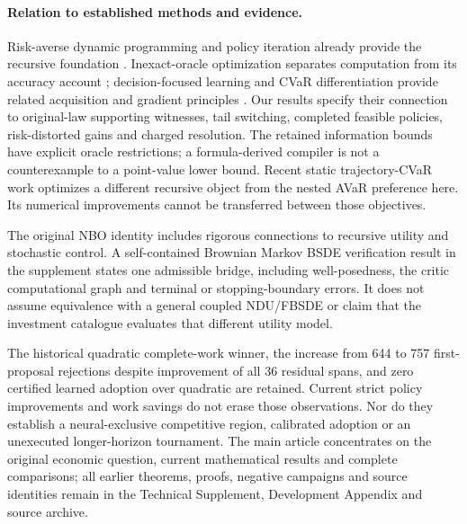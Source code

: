 \paragraph{Relation to established methods and evidence.}
Risk-averse dynamic programming and policy iteration already provide the recursive foundation \citep{ruszczynski2010risk,ruszczynski2014erratum}. Inexact-oracle optimization separates computation from its accuracy account \citep{DevolderGlineurNesterov2014}; decision-focused learning and CVaR differentiation provide related acquisition and gradient principles \citep{ElmachtoubGrigas2022,Tamar2015}. Our results specify their connection to original-law supporting witnesses, tail switching, completed feasible policies, risk-distorted gains and charged resolution. The retained information bounds have explicit oracle restrictions; a formula-derived compiler is not a counterexample to a point-value lower bound. Recent static trajectory-CVaR work \citep{LuoDelage2026} optimizes a different recursive object from the nested AVaR preference here. Its numerical improvements cannot be transferred between those objectives.

The original NBO identity includes rigorous connections to recursive utility and stochastic control. A self-contained Brownian Markov BSDE verification result in the supplement states one admissible bridge, including well-posedness, the critic computational graph and terminal or stopping-boundary errors. It does not assume equivalence with a general coupled NDU/FBSDE or claim that the investment catalogue evaluates that different utility model.

The historical quadratic complete-work winner, the increase from 644 to 757 first-proposal rejections despite improvement of all 36 residual spans, and zero certified learned adoption over quadratic are retained. Current strict policy improvements and work savings do not erase those observations. Nor do they establish a neural-exclusive competitive region, calibrated adoption or an unexecuted longer-horizon tournament. The main article concentrates on the original economic question, current mathematical results and complete comparisons; all earlier theorems, proofs, negative campaigns and source identities remain in the Technical Supplement, Development Appendix and source archive.

